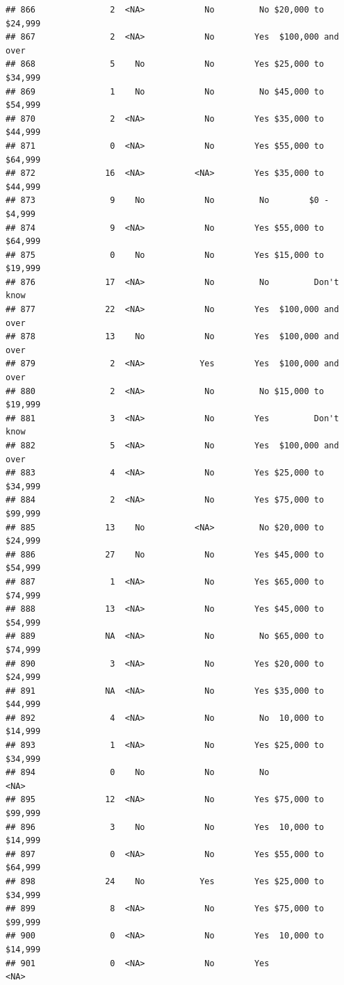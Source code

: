 \documentclass[man]{apa6}
\begin{document}
\begin{verbatim}
## 866               2  <NA>            No         No $20,000 to $24,999
## 867               2  <NA>            No        Yes  $100,000 and over
## 868               5    No            No        Yes $25,000 to $34,999
## 869               1    No            No         No $45,000 to $54,999
## 870               2  <NA>            No        Yes $35,000 to $44,999
## 871               0  <NA>            No        Yes $55,000 to $64,999
## 872              16  <NA>          <NA>        Yes $35,000 to $44,999
## 873               9    No            No         No        $0 - $4,999
## 874               9  <NA>            No        Yes $55,000 to $64,999
## 875               0    No            No        Yes $15,000 to $19,999
## 876              17  <NA>            No         No         Don't know
## 877              22  <NA>            No        Yes  $100,000 and over
## 878              13    No            No        Yes  $100,000 and over
## 879               2  <NA>           Yes        Yes  $100,000 and over
## 880               2  <NA>            No         No $15,000 to $19,999
## 881               3  <NA>            No        Yes         Don't know
## 882               5  <NA>            No        Yes  $100,000 and over
## 883               4  <NA>            No        Yes $25,000 to $34,999
## 884               2  <NA>            No        Yes $75,000 to $99,999
## 885              13    No          <NA>         No $20,000 to $24,999
## 886              27    No            No        Yes $45,000 to $54,999
## 887               1  <NA>            No        Yes $65,000 to $74,999
## 888              13  <NA>            No        Yes $45,000 to $54,999
## 889              NA  <NA>            No         No $65,000 to $74,999
## 890               3  <NA>            No        Yes $20,000 to $24,999
## 891              NA  <NA>            No        Yes $35,000 to $44,999
## 892               4  <NA>            No         No  10,000 to $14,999
## 893               1  <NA>            No        Yes $25,000 to $34,999
## 894               0    No            No         No               <NA>
## 895              12  <NA>            No        Yes $75,000 to $99,999
## 896               3    No            No        Yes  10,000 to $14,999
## 897               0  <NA>            No        Yes $55,000 to $64,999
## 898              24    No           Yes        Yes $25,000 to $34,999
## 899               8  <NA>            No        Yes $75,000 to $99,999
## 900               0  <NA>            No        Yes  10,000 to $14,999
## 901               0  <NA>            No        Yes               <NA>

\end{verbatim}
\end{document}
